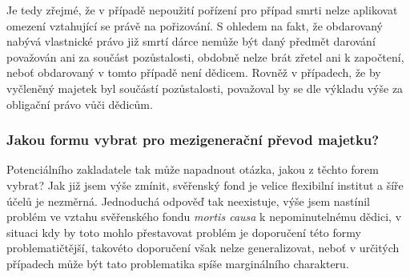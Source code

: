 \documentclass{article}
\begin{document}
Je tedy zřejmé, že v případě nepoužití pořízení pro případ smrti nelze aplikovat omezení vztahující se právě na pořizování. S ohledem na fakt, že obdarovaný nabývá vlastnické právo již smrtí dárce nemůže být daný předmět darování považován ani za součást pozůstalosti, obdobně nelze brát zřetel ani k započtení, neboť obdarovaný v tomto případě není dědicem. Rovněž v případech, že by vyčleněný majetek byl součástí pozůstalosti, považoval by se dle výkladu výše za obligační právo vůči dědicům.\\







\subsubsection{Jakou formu vybrat pro mezigenerační převod majetku?}

Potenciálního zakladatele tak může napadnout otázka, jakou z těchto forem vybrat? Jak již jsem výše zmínit, svěřenský fond je velice flexibilní institut a šíře účelů je nezměrná. Jednoduchá odpověď tak neexistuje, výše jsem nastínil problém ve vztahu svěřenského fondu \textit{mortis causa} k nepominutelnému dědici, v situaci kdy by toto mohlo přestavovat problém je doporučení této formy problematičtější, takovéto doporučení však nelze generalizovat, neboť v určitých případech může být tato problematika spíše marginálního charakteru.\\
\end{document}
